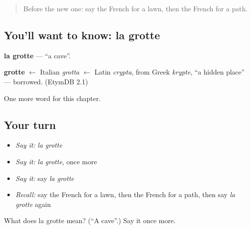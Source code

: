\begin{quote}
Before the new one: say the French for a lawn, then the French for a path.
\end{quote}

\subsection*{You'll want to know: la grotte}
\textbf{la grotte} — \textquotedblleft{}a cave\textquotedblright{}.

\begin{cousinweb}
\textbf{grotte} $\leftarrow$ Italian \emph{grotta} $\leftarrow$ Latin \emph{crypta}, from Greek \emph{krypte}, \textquotedblleft{}a hidden place\textquotedblright{} — borrowed. (EtymDB 2.1)
\end{cousinweb}

\begin{grammarlens}[title={What you've built}]
One more word for this chapter.
\end{grammarlens}

\subsection*{Your turn}
\begin{itemize}
\raggedright
  \item \emph{Say it:} \emph{la grotte}
  \item \emph{Say it:} \emph{la grotte}, once more
  \item \emph{Say it:} say \emph{la grotte}
  \item \emph{Recall:} say the French for a lawn, then the French for a path, then say \emph{la grotte} again
\end{itemize}

\begin{tcolorbox}[breakable,colback=teal!4,colframe=teal!35!black,title={Before you move on}]
What does la grotte mean? (\textquotedblleft{}A cave\textquotedblright{}.) Say it once more.
\end{tcolorbox}
